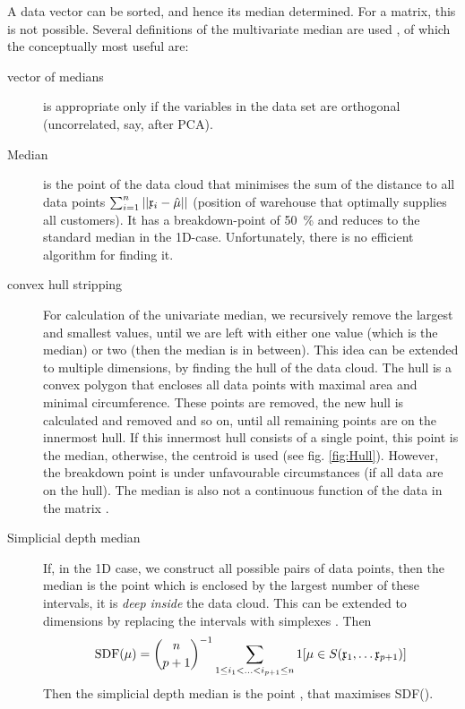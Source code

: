\begin{refsection}
A data vector can be sorted, and hence its median determined. For a matrix, this is not possible. Several definitions of the multivariate median are used \parencite{Sma-90}, of which the conceptually most useful are:
\begin{description}
  \item[vector of medians]{is appropriate only if the variables in the data set are orthogonal (uncorrelated, say, after \acs{PCA}). }
  \item[ Median]{is the point of the data cloud that minimises the sum of the distance to all data points \( \sum_{i=1}^n{||\mathfrak{x}_i - \hat{\mu}||} \) (position of warehouse that optimally supplies all customers). It has a breakdown-point of \SI{50}{\%} and reduces to the standard median in the 1D-case. Unfortunately, there is no efficient algorithm for finding it.}
  \item[convex hull stripping]{For calculation of the univariate median, we recursively remove the largest and smallest values, until we are left with either one value (which is the median) or two (then the median is in between). This idea can be extended to multiple dimensions, by finding the hull of the data cloud. The hull is a convex polygon that encloses all data points with maximal area and minimal circumference. These points are removed, the new hull is calculated and removed and so on, until all remaining points are on the innermost hull. If this innermost hull consists of a single point, this point is the median, otherwise, the centroid is used (see fig. \ref{fig:Hull}).
      However, the breakdown point is  under unfavourable circumstances (if all data are on the hull). The median is also not a continuous function of the data in the matrix . }
  \item[Simplicial depth median]{If, in the 1D case, we construct all possible pairs of data points, then the median is the point which is enclosed by the largest number of these intervals, it is \emph{deep inside} the data cloud. This can be extended to  dimensions by replacing the intervals with simplexes . Then
      \begin{equation}
        \mathrm{SDF}(\mu) = \binom{n}{p+1}^{-1} \sum_{1\leq i_1< \ldots < i_{p+1} \leq n}{1[\mu \in S(\mathfrak{x}_1, \ldots \mathfrak{x}_{p+1})]}
      \end{equation}
      Then the simplicial depth median is the point \skalar{\hat{\mu}}, that maximises SDF(\skalar{\mu}).
      }
\end{description}


\end{refsection}
